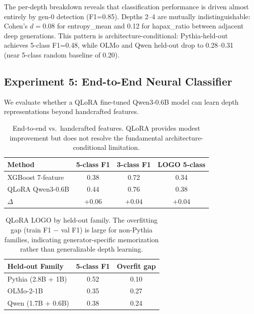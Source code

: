 \documentclass[11pt,a4paper]{article}
\begin{document}
The per-depth breakdown reveals that classification performance is driven almost entirely by gen-0 detection (F1=0.85). Depths 2--4 are mutually indistinguishable: Cohen's $d=0.08$ for entropy\_mean and 0.12 for hapax\_ratio between adjacent deep generations. This pattern is architecture-conditional: Pythia-held-out achieves 5-class F1=0.48, while OLMo and Qwen held-out drop to 0.28--0.31 (near 5-class random baseline of 0.20).

\subsection{Experiment 5: End-to-End Neural Classifier}
\label{sec:exp5}

We evaluate whether a QLoRA fine-tuned Qwen3-0.6B model can learn depth representations beyond handcrafted features.

\begin{table}[h]
\centering
\small
\begin{tabular}{lccc}
\toprule
\textbf{Method} & \textbf{5-class F1} & \textbf{3-class F1} & \textbf{LOGO 5-class} \\
\midrule
XGBoost 7-feature & 0.38 & 0.72 & 0.34 \\
QLoRA Qwen3-0.6B & 0.44 & 0.76 & 0.38 \\
$\Delta$ & $+0.06$ & $+0.04$ & $+0.04$ \\
\bottomrule
\end{tabular}
\caption{End-to-end vs.\ handcrafted features. QLoRA provides modest improvement but does not resolve the fundamental architecture-conditional limitation.}
\label{tab:e2e}
\end{table}

\begin{table}[h]
\centering
\small
\begin{tabular}{lcc}
\toprule
\textbf{Held-out Family} & \textbf{5-class F1} & \textbf{Overfit gap} \\
\midrule
Pythia (2.8B + 1B) & 0.52 & 0.10 \\
OLMo-2-1B & 0.35 & 0.27 \\
Qwen (1.7B + 0.6B) & 0.38 & 0.24 \\
\bottomrule
\end{tabular}
\caption{QLoRA LOGO by held-out family. The overfitting gap (train F1 $-$ val F1) is large for non-Pythia families, indicating generator-specific memorization rather than generalizable depth learning.}
\label{tab:e2e_logo}
\end{table}
\end{document}
